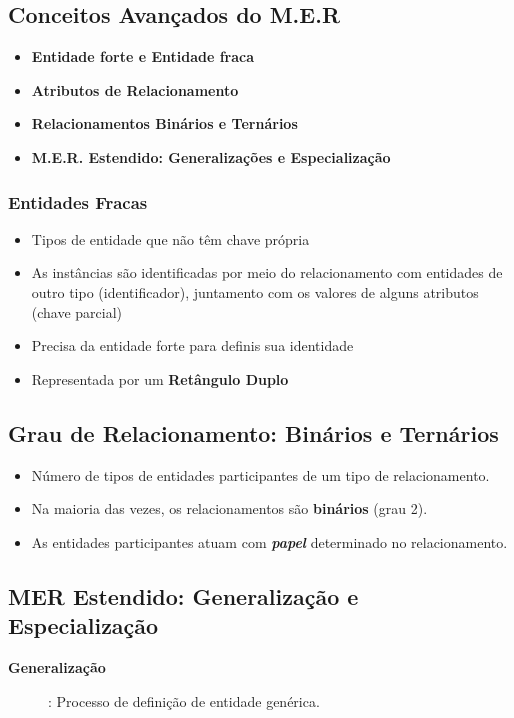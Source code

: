 \documentclass[12pt,a4paper]{article}
\begin{document}
\subsection{Conceitos Avançados do M.E.R}
\begin{itemize}
    \item \textbf{Entidade forte e Entidade fraca}
    \item \textbf{Atributos de Relacionamento}
    \item \textbf{Relacionamentos Binários e Ternários}
    \item \textbf{M.E.R. Estendido: Generalizações e Especialização}
\end{itemize}

\subsubsection{Entidades Fracas}
\begin{itemize}
    \item Tipos de entidade que não têm chave própria
    \item As instâncias são identificadas por meio do relacionamento com entidades de outro tipo (identificador), juntamento com os valores de alguns atributos (chave parcial)
    \item Precisa da entidade forte para definis sua identidade
    \item Representada por um \textbf{Retângulo Duplo}
\end{itemize}

\subsection{Grau de Relacionamento: Binários e Ternários}
\begin{itemize}
    \item
        Número de tipos de entidades participantes de um tipo de re\-la\-cio\-na\-men\-to.
    \item
        Na maioria das vezes, os relacionamentos são \textbf{binários} (grau 2).
    \item 
        As entidades participantes atuam com \textbf{\textit{papel}} determinado no relacionamento.
\end{itemize}


\subsection{MER Estendido: Generalização e Especialização}
\begin{description}
    \item[\textbf{Generalização}]: Processo de definição de entidade genérica.
\end{description}
\end{document}
